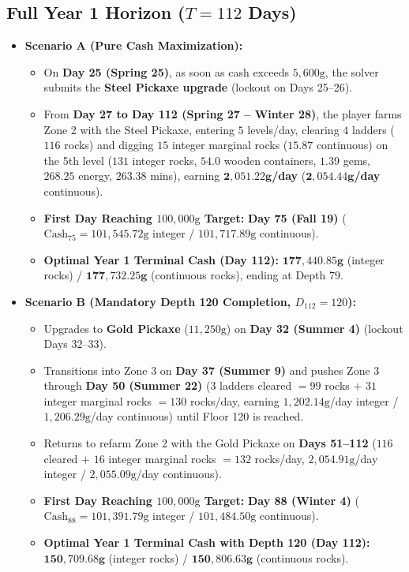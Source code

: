 \documentclass[11pt,a4paper]{article}
\begin{document}
\subsection{Full Year 1 Horizon ($T = 112$ Days)}
\begin{itemize}
    \item \textbf{Scenario A (Pure Cash Maximization):}
    \begin{itemize}
        \item On \textbf{Day 25 (Spring 25)}, as soon as cash exceeds $5,600\text{g}$, the solver submits the \textbf{Steel Pickaxe upgrade} (lockout on Days 25--26).
        \item From \textbf{Day 27 to Day 112 (Spring 27 -- Winter 28)}, the player farms Zone 2 with the Steel Pickaxe, entering $5$ levels/day, clearing $4$ ladders ($116$ rocks) and digging $15$ integer marginal rocks ($15.87$ continuous) on the 5th level ($131$ integer rocks, $54.0$ wooden containers, $1.39$ gems, $268.25$ energy, $263.38$ mins), earning $\mathbf{2,051.22\text{g}}$\textbf{/day} ($\mathbf{2,054.44\text{g}}$\textbf{/day} continuous).
        \item \textbf{First Day Reaching $100,000\text{g}$ Target:} \textbf{Day 75 (Fall 19)} ($\text{Cash}_{75} = 101,545.72\text{g}$ integer / $101,717.89\text{g}$ continuous).
        \item \textbf{Optimal Year 1 Terminal Cash (Day 112):} $\mathbf{177,440.85\text{g}}$ (integer rocks) / $\mathbf{177,732.25\text{g}}$ (continuous rocks), ending at Depth $79$.
    \end{itemize}
    \item \textbf{Scenario B (Mandatory Depth 120 Completion, $D_{112} = 120$):}
    \begin{itemize}
        \item Upgrades to \textbf{Gold Pickaxe} ($11,250\text{g}$) on \textbf{Day 32 (Summer 4)} (lockout Days 32--33).
        \item Transitions into Zone 3 on \textbf{Day 37 (Summer 9)} and pushes Zone 3 through \textbf{Day 50 (Summer 22)} ($3$ ladders cleared $= 99$ rocks $+$ $31$ integer marginal rocks $= 130$ rocks/day, earning $1,202.14\text{g}$/day integer / $1,206.29\text{g}$/day continuous) until Floor 120 is reached.
        \item Returns to refarm Zone 2 with the Gold Pickaxe on \textbf{Days 51--112} ($116$ cleared $+$ $16$ integer marginal rocks $= 132$ rocks/day, $2,054.91\text{g}$/day integer / $2,055.09\text{g}$/day continuous).
        \item \textbf{First Day Reaching $100,000\text{g}$ Target:} \textbf{Day 88 (Winter 4)} ($\text{Cash}_{88} = 101,391.79\text{g}$ integer / $101,484.50\text{g}$ continuous).
        \item \textbf{Optimal Year 1 Terminal Cash with Depth 120 (Day 112):} $\mathbf{150,709.68\text{g}}$ (integer rocks) / $\mathbf{150,806.63\text{g}}$ (continuous rocks).
    \end{itemize}
\end{itemize}
\end{document}
